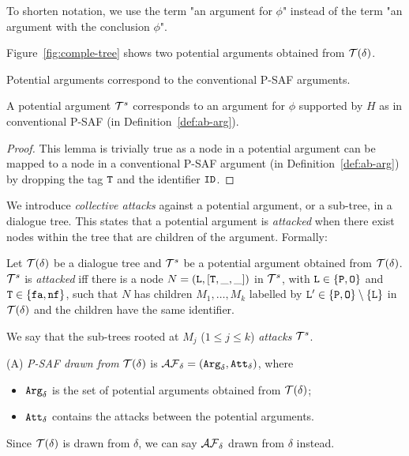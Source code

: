 To shorten notation, we use the term "an argument for $\phi$" instead of the term "an argument with the conclusion $\phi$".

\begin{example} 
Figure~\ref{fig:comple-tree} shows two potential arguments obtained from $\mathcal{T}(\delta)$.
\end{example}

Potential arguments correspond to the conventional P-SAF arguments.

\begin{lemma}
\label{lem:potential-arg}
A potential argument $\mathcal{T}^{s}$ corresponds to an argument for $\phi$ supported by $H$ as in conventional P-SAF (in Definition~\ref{def:ab-arg}).
\end{lemma}

\begin{proof} This lemma is trivially true as a node in a potential argument can be mapped to a node in a conventional P-SAF argument (in Definition~\ref{def:ab-arg}) by dropping the tag $\texttt{\textup{T}}$ and the identifier $\texttt{\textup{ID}}$.
\end{proof}

We introduce \emph{collective attacks} against a potential argument, or a sub-tree, in a dialogue tree. This states that a potential argument is \emph{attacked} when there exist nodes within the tree that are children of the argument. Formally:

\begin{definition}
Let $\mathcal{T}(\delta)$ be a dialogue tree and $\mathcal{T}^{s}$ be a potential argument obtained from $\mathcal{T}(\delta)$. $\mathcal{T}^{s}$ is \emph{attacked} iff there is a node $N = (\texttt{\textup{L}}, [\texttt{\textup{T}}, \_, \_])$ in $\mathcal{T}^{s}$, with $\texttt{\textup{L}} \in \{\texttt{\textup{P}}, \texttt{\textup{O}}\}$ and $\texttt{\textup{T}} \in \{\texttt{\textup{fa}}, \texttt{\textup{nf}}\}$, such that $N$ has children $M_1, \ldots, M_k$ labelled by $\texttt{\textup{L}}^{\prime} \in \{\texttt{\textup{P}}, \texttt{\textup{O}}\}\setminus\{\texttt{\textup{L}}\}$ in $\mathcal{T}(\delta)$ and the children have the same identifier.
    
    We say that the sub-trees rooted at $M_j$ ($1 \leq j \leq k$) \emph{attacks} $\mathcal{T}^{s}$.

\end{definition}

\begin{definition} (A) \emph{P-SAF drawn from} $\mathcal{T}(\delta)$ is $ \mathcal{AF}_ \delta = (\texttt{\textup{Arg}}_{\delta}, \texttt{\textup{Att}}_{\delta})$, where 
\begin{itemize}
    \item $\texttt{\textup{Arg}}_{\delta}$ is the set of potential arguments obtained from $\mathcal{T}(\delta)$;
    \item $\texttt{\textup{Att}}_{\delta}$ contains the attacks between the potential arguments.
\end{itemize}
\end{definition}
Since $\mathcal{T}(\delta)$ is drawn from $\delta$, we can say $\mathcal{AF}_ \delta$ drawn from $\delta$ instead.


